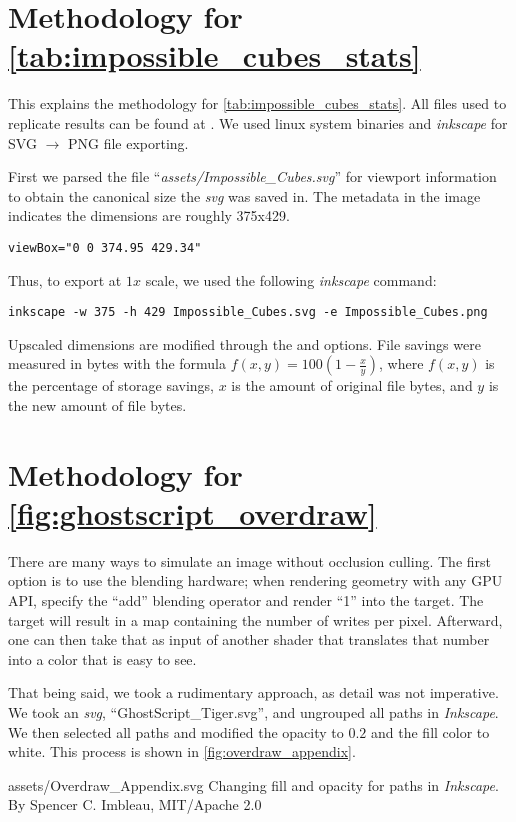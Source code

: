 \appendix
{}\label{sec:appendix}
\renewcommand{\thesection}{\Alph{section}}

\section{Methodology for \cref{tab:impossible_cubes_stats}}
\label{appendix:svg_vs_png}
This explains the methodology for \cref{tab:impossible_cubes_stats}.
All files used to replicate results can be found at \thesisrepo. We used linux system binaries and \textit{inkscape} for SVG $\rightarrow$ PNG file exporting.\medskip

First we parsed the file ``\textit{assets/Impossible\_Cubes.svg}'' for viewport information to obtain the canonical size the \textit{svg} was saved in. The metadata in the image indicates the dimensions are roughly 375x429.
\medskip

\begin{verbatim}viewBox="0 0 374.95 429.34"\end{verbatim}
\medskip

Thus, to export at $1x$ scale, we used the following \textit{inkscape} command:

\begin{verbatim}inkscape -w 375 -h 429 Impossible_Cubes.svg -e Impossible_Cubes.png\end{verbatim}
\medskip

Upscaled dimensions are modified through the  and  options. File savings were measured in bytes with the formula $f(x,y)=100(1-\frac{x}{y})$, where $f(x,y)$ is the percentage of storage savings, $x$ is the amount of original file bytes, and $y$ is the new amount of file bytes.

\section{Methodology for \cref{fig:ghostscript_overdraw}}
\label{appendix:overdraw}
There are many ways to simulate an image without occlusion culling. The first option is to use the blending hardware; when rendering geometry with any GPU API, specify the ``add'' blending operator and render ``1'' into the target. The target will result in a map containing the number of writes per pixel. Afterward, one can then take that as input of another shader that translates that number into a color that is easy to see.\medskip

That being said, we took a rudimentary approach, as detail was not imperative. We took an \textit{svg}, ``GhostScript\_Tiger.svg'', and ungrouped all paths in \textit{Inkscape}. We then selected all paths and modified the opacity to \(0.2\) and the fill color to white. This process is shown in \cref{fig:overdraw_appendix}.\medskip

\widesvg
{assets/Overdraw_Appendix.svg}
{Changing fill and opacity for paths in \textit{Inkscape}.\label{fig:overdraw_appendix}}
{By Spencer C. Imbleau, MIT/Apache 2.0}



